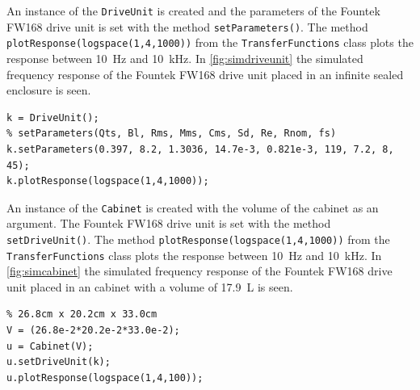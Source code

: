 \FloatBarrier
 
An instance of the \texttt{DriveUnit} is created and the parameters of the Fountek FW168 drive unit is set with the method \texttt{setParameters()}.
The method \texttt{plotResponse(logspace(1,4,1000))} from the \texttt{TransferFunctions} class plots the response between \SI{10}{\hertz} and \SI{10}{\kilo\hertz}.
In \cref{fig:simdriveunit} the simulated frequency response of the Fountek FW168 drive unit placed in an infinite sealed enclosure is seen.
\begin{verbatim}
k = DriveUnit();
% setParameters(Qts, Bl, Rms, Mms, Cms, Sd, Re, Rnom, fs)
k.setParameters(0.397, 8.2, 1.3036, 14.7e-3, 0.821e-3, 119, 7.2, 8, 45); 
k.plotResponse(logspace(1,4,1000));
\end{verbatim}

An instance of the \texttt{Cabinet} is created with the volume of the cabinet as an argument.
The Fountek FW168 drive unit is set with the method \texttt{setDriveUnit()}.
The method \texttt{plotResponse(logspace(1,4,1000))} from the \texttt{TransferFunctions} class plots the response between \SI{10}{\hertz} and \SI{10}{\kilo\hertz}.
In \cref{fig:simcabinet} the simulated frequency response of the Fountek FW168 drive unit placed in an cabinet with a volume of \SI{17.9}{\liter} is seen. 

\begin{verbatim}
% 26.8cm x 20.2cm x 33.0cm
V = (26.8e-2*20.2e-2*33.0e-2); 
u = Cabinet(V);
u.setDriveUnit(k);
u.plotResponse(logspace(1,4,100));
\end{verbatim}

